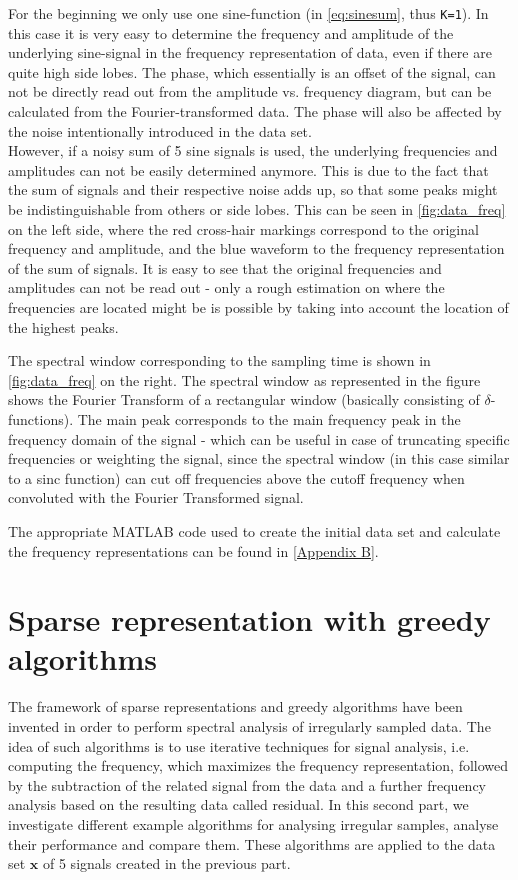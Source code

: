 For the beginning we only use one sine-function (in \cref{eq:sinesum}, thus \texttt{K=1}). In this case it is very easy to determine the frequency and amplitude of the underlying sine-signal in the frequency representation of data, even if there are quite high side lobes. The phase, which essentially is an offset of the signal, can not be directly read out from the amplitude vs. frequency diagram, but can be calculated from the Fourier-transformed data. The phase will also be affected by the noise intentionally introduced in the data set.\\
However, if a noisy sum of 5 sine signals is used, the underlying frequencies and amplitudes can not be easily determined anymore. This is due to the fact that the sum of signals and their respective noise adds up, so that some peaks might be indistinguishable from others or side lobes. This can be seen in \cref{fig:data_freq} on the left side, where the red cross-hair markings correspond to the original frequency and amplitude, and the blue waveform to the frequency representation of the sum of signals. It is easy to see that the original frequencies and amplitudes can not be read out - only a rough estimation on where the frequencies are located might be is possible by taking into account the location of the highest peaks.

The spectral window corresponding to the sampling time is shown in \cref{fig:data_freq} on the right. The spectral window as represented in the figure shows the Fourier Transform of a rectangular window (basically consisting of $\delta$-functions). The main peak corresponds to the main frequency peak in the frequency domain of the signal - which can be useful in case of truncating specific frequencies or weighting the signal, since the spectral window (in this case similar to a sinc function) can cut off frequencies above the cutoff frequency when convoluted with the Fourier Transformed signal.

The appropriate MATLAB code used to create the initial data set and calculate the frequency representations can be found in \cref{Appendix B}.


\section{Sparse representation with greedy algorithms}
The framework of sparse representations and greedy algorithms have been invented in order to perform spectral analysis of irregularly sampled data. The idea of such algorithms is to use iterative techniques for signal analysis, i.e. computing the frequency, which maximizes the frequency representation, followed by the subtraction of the related signal from the data and a further frequency analysis based on the resulting data called residual. In this second part, we investigate different example algorithms for analysing irregular samples, analyse their performance and compare them. These algorithms are applied to the data set $\boldsymbol{x}$ of 5 signals created in the previous part.
